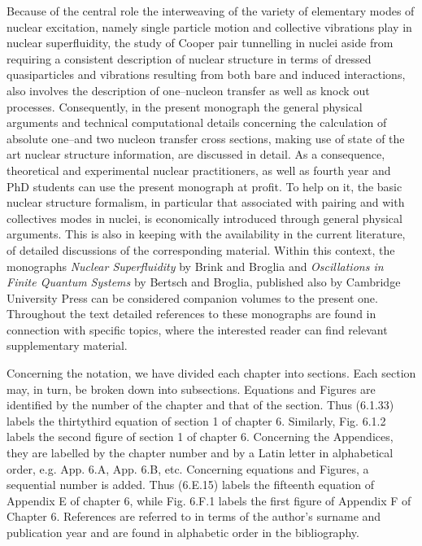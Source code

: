 Because of the central role the interweaving of the variety of elementary modes of nuclear excitation, namely single particle motion and collective vibrations play in nuclear superfluidity, the study of Cooper pair tunnelling in nuclei aside from requiring a consistent description of nuclear structure in terms of dressed quasiparticles and vibrations resulting from both bare and induced interactions, also involves  the description of one--nucleon transfer as well as knock out processes. Consequently, in the present monograph the general physical arguments and technical computational details concerning the   calculation of  absolute one--and two nucleon  transfer cross sections, making use of state of the art nuclear structure information, are discussed in detail. As a consequence, theoretical and experimental nuclear practitioners, as well as fourth year and PhD students can use the present monograph at profit. To help on it, the basic nuclear structure formalism, in particular that associated with pairing and with collectives modes in nuclei, is economically introduced through general physical arguments. This is also in keeping with the availability in the current literature, of detailed discussions of the corresponding material. Within this context, the monographs \emph{Nuclear Superfluidity} by Brink and Broglia and \emph{Oscillations in Finite Quantum Systems}  by Bertsch and Broglia, published also by Cambridge University Press can be considered companion volumes to the present one. Throughout the text detailed references to these monographs are found in connection with specific topics, where the interested reader can find relevant supplementary material.


Concerning the notation, we have divided each chapter into sections. Each section may, in turn, be broken down into subsections. Equations and Figures are identified by the number of the chapter and that of the section. Thus (6.1.33) labels the thirtythird equation of section 1 of chapter 6. Similarly, Fig. 6.1.2 labels the second figure of section 1 of chapter 6. Concerning the Appendices, they are labelled by the chapter number and by a Latin letter in alphabetical order, e.g. App. 6.A, App. 6.B, etc. Concerning equations and Figures, a sequential number is added. Thus (6.E.15) labels the fifteenth equation of Appendix E of chapter 6, while Fig. 6.F.1 labels the first figure of Appendix F of Chapter 6. References are referred to in terms of the author's surname and publication year and are found in alphabetic order in the bibliography.

